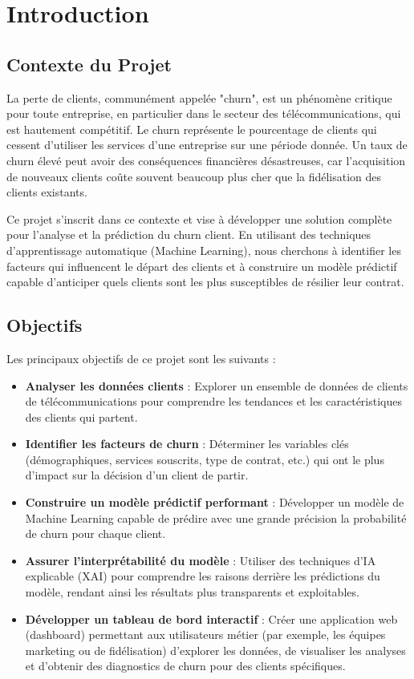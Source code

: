 \chapter{Introduction}

\section{Contexte du Projet}
La perte de clients, communément appelée "churn", est un phénomène critique pour toute entreprise, en particulier dans le secteur des télécommunications, qui est hautement compétitif. Le churn représente le pourcentage de clients qui cessent d'utiliser les services d'une entreprise sur une période donnée. Un taux de churn élevé peut avoir des conséquences financières désastreuses, car l'acquisition de nouveaux clients coûte souvent beaucoup plus cher que la fidélisation des clients existants.

Ce projet s'inscrit dans ce contexte et vise à développer une solution complète pour l'analyse et la prédiction du churn client. En utilisant des techniques d'apprentissage automatique (Machine Learning), nous cherchons à identifier les facteurs qui influencent le départ des clients et à construire un modèle prédictif capable d'anticiper quels clients sont les plus susceptibles de résilier leur contrat.

\section{Objectifs}
Les principaux objectifs de ce projet sont les suivants :
\begin{itemize}[label=\textcolor{maincolor}{\textbullet}]
    \item \textbf{Analyser les données clients} : Explorer un ensemble de données de clients de télécommunications pour comprendre les tendances et les caractéristiques des clients qui partent.
    \item \textbf{Identifier les facteurs de churn} : Déterminer les variables clés (démographiques, services souscrits, type de contrat, etc.) qui ont le plus d'impact sur la décision d'un client de partir.
    \item \textbf{Construire un modèle prédictif performant} : Développer un modèle de Machine Learning capable de prédire avec une grande précision la probabilité de churn pour chaque client.
    \item \textbf{Assurer l'interprétabilité du modèle} : Utiliser des techniques d'IA explicable (XAI) pour comprendre les raisons derrière les prédictions du modèle, rendant ainsi les résultats plus transparents et exploitables.
    \item \textbf{Développer un tableau de bord interactif} : Créer une application web (dashboard) permettant aux utilisateurs métier (par exemple, les équipes marketing ou de fidélisation) d'explorer les données, de visualiser les analyses et d'obtenir des diagnostics de churn pour des clients spécifiques.
\end{itemize}

